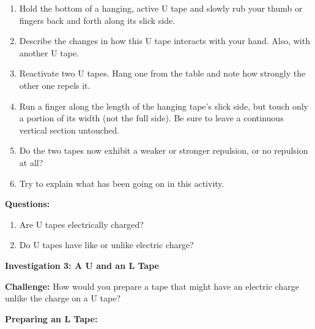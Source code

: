 \begin{enumerate}
\item Hold the bottom of a hanging, active U tape and slowly rub your thumb
or fingers back and forth along its slick side.
\item Describe the changes in how this U tape interacts with your hand.
Also, with another U tape.\vspace{15mm}

\item Reactivate two U tapes. Hang one from the table and note how strongly
the other one repels it.\vspace{15mm}

\item Run a finger along the length of the hanging tape's slick side, but
touch only a portion of its width (not the full side). Be sure to
leave a continuous vertical section untouched. 
\item Do the two tapes now exhibit a weaker or stronger repulsion, or no
repulsion at all?\vspace{15mm}

\item Try to explain what has been going on in this activity.\vspace{15mm}

\end{enumerate}
\textbf{Questions:}

\begin{enumerate}
\item Are U tapes electrically charged?\vspace{10mm}

\item Do U tapes have like or unlike electric charge?\vspace{10mm}

\end{enumerate}
\textbf{Investigation 3: A U and an L Tape}

\textbf{Challenge:} How would you prepare a tape that might have an
electric charge unlike the charge on a U tape?

\textbf{Preparing an L Tape:}

